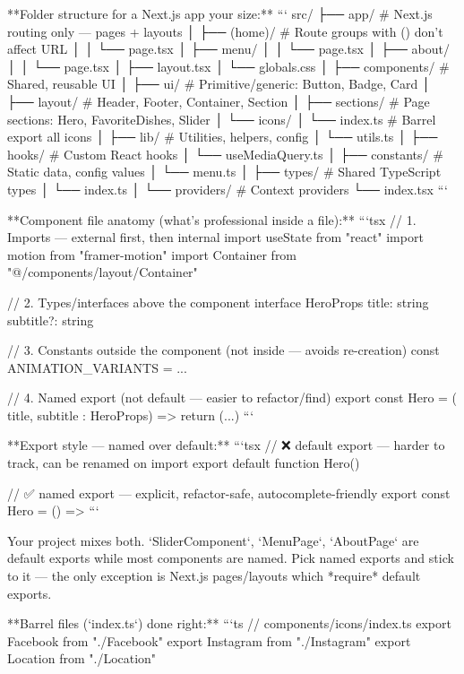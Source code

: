 **Folder structure for a Next.js app your size:**
```
src/
├── app/                        # Next.js routing only — pages + layouts
│   ├── (home)/                 # Route groups with () don't affect URL
│   │   └── page.tsx
│   ├── menu/
│   │   └── page.tsx
│   ├── about/
│   │   └── page.tsx
│   ├── layout.tsx
│   └── globals.css
│
├── components/                 # Shared, reusable UI
│   ├── ui/                     # Primitive/generic: Button, Badge, Card
│   ├── layout/                 # Header, Footer, Container, Section
│   ├── sections/               # Page sections: Hero, FavoriteDishes, Slider
│   └── icons/
│       └── index.ts            # Barrel export all icons
│
├── lib/                        # Utilities, helpers, config
│   └── utils.ts
│
├── hooks/                      # Custom React hooks
│   └── useMediaQuery.ts
│
├── constants/                  # Static data, config values
│   └── menu.ts
│
├── types/                      # Shared TypeScript types
│   └── index.ts
│
└── providers/                  # Context providers
    └── index.tsx
```

**Component file anatomy (what's professional inside a file):**
```tsx
// 1. Imports — external first, then internal
import { useState } from "react"
import { motion } from "framer-motion"
import { Container } from "@/components/layout/Container"

// 2. Types/interfaces above the component
interface HeroProps {
  title: string
  subtitle?: string
}

// 3. Constants outside the component (not inside — avoids re-creation)
const ANIMATION_VARIANTS = { ... }

// 4. Named export (not default — easier to refactor/find)
export const Hero = ({ title, subtitle }: HeroProps) => {
  return (...)
}
```

**Export style — named over default:**
```tsx
// ❌ default export — harder to track, can be renamed on import
export default function Hero() {}

// ✅ named export — explicit, refactor-safe, autocomplete-friendly
export const Hero = () => {}
```

Your project mixes both. `SliderComponent`, `MenuPage`, `AboutPage` are default exports while most components are named. Pick named exports and stick to it — the only exception is Next.js pages/layouts which *require* default exports.

**Barrel files (`index.ts`) done right:**
```ts
// components/icons/index.ts
export { Facebook } from "./Facebook"
export { Instagram } from "./Instagram"
export { Location } from "./Location"

